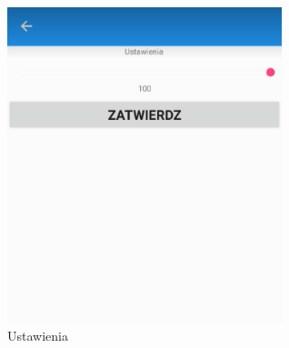 	\begin{figure}[!htb]
	\begin{center}
		\includegraphics[width=8cm]{rys/ustawienia.png}
		\caption{Ustawienia}
		\label{rys:rysunek001}
	\end{center}
\end{figure}


